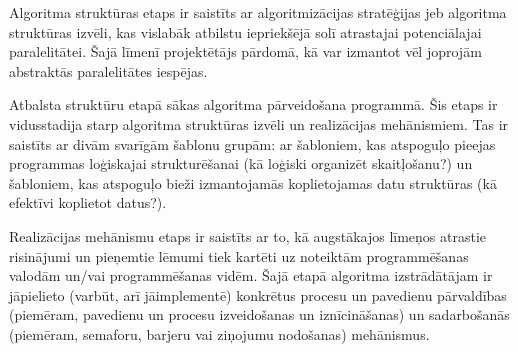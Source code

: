 Algoritma struktūras etaps ir saistīts ar algoritmizācijas stratēģijas jeb algoritma
struktūras izvēli, kas vislabāk atbilstu iepriekšējā solī atrastajai potenciālajai paralelitātei.
Šajā līmenī projektētājs pārdomā, kā var izmantot vēl joprojām abstraktās paralelitātes iespējas.


Atbalsta struktūru etapā sākas algoritma pārveidošana programmā. Šis etaps ir vidusstadija
starp algoritma struktūras izvēli un realizācijas mehānismiem. Tas ir saistīts ar divām svarīgām
šablonu grupām: ar šabloniem, kas atspoguļo pieejas programmas loģiskajai strukturēšanai
(kā loģiski organizēt skaitļošanu?) un šabloniem, kas atspoguļo bieži izmantojamās koplietojamas
datu struktūras (kā efektīvi koplietot datus?).



Realizācijas mehānismu etaps ir saistīts ar to, kā augstākajos līmeņos atrastie risinājumi
un pieņemtie lēmumi tiek kartēti uz noteiktām programmēšanas valodām un/vai programmēšanas
vidēm. Šajā etapā algoritma izstrādātājam ir jāpielieto (varbūt, arī jāimplementē) konkrētus
procesu un pavedienu pārvaldības (piemēram, pavedienu un procesu izveidošanas un iznīcināšanas)
un sadarbošanās (piemēram, semaforu, barjeru vai ziņojumu nodošanas) mehānismus.

